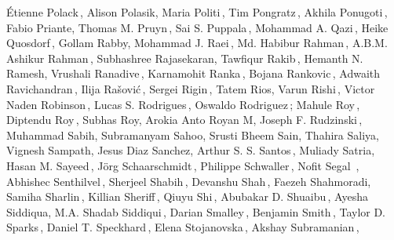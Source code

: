 \begin{center}
Étienne Polack\,,\;
Alison Polasik,\;
Maria Politi\,,\;
Tim Pongratz\,,\;
Akhila Ponugoti\,,\;
Fabio Priante,\;
Thomas M. Pruyn\,,\;
Sai S. Puppala\,,\;
Mohammad A. Qazi\,,\;
Heike Quosdorf\,,\;
Gollam Rabby,\;
Mohammad J. Raei\,,\;
Md. Habibur Rahman\,,\;
A.B.M. Ashikur Rahman\,,\;
Subhashree Rajasekaran,\;
Tawfiqur Rakib\,,\;
Hemanth N. Ramesh,\;
Vrushali Ranadive\,,\;
Karnamohit Ranka\,,\;
Bojana Rankovic\,,\;
Adwaith Ravichandran\,,\;
Ilija Rašović\,,\;
Sergei Rigin\,,\;
Tatem Rios,\;
Varun Rishi\,,\;
Victor Naden Robinson\,,\;
Lucas S. Rodrigues\,,\;
Oswaldo Rodriguez\,;
Mahule Roy\,,\;
Diptendu Roy\,,\;
Subhas Roy,\;
Arokia Anto Royan M,\;
Joseph F. Rudzinski\,,\;
Muhammad Sabih,\;
Subramanyam Sahoo,\;
Srusti Bheem Sain,\;
Thahira Saliya,\;
Vignesh Sampath,\;
Jesus Diaz Sanchez,\;
Arthur S. S. Santos\,,\;
Muliady Satria,\;
Hasan M. Sayeed\,,\;
Jörg Schaarschmidt\,,\;
Philippe Schwaller\,,\;
Nofit Segal\, ,\;
Abhishec Senthilvel\,,\;
Sherjeel Shabih\,,\;
Devanshu Shah\,,\;
Faezeh Shahmoradi,\;
Samiha Sharlin\,,\;
Killian Sheriff\,,\;
Qiuyu Shi\,,\;
Abubakar D. Shuaibu\,,\;
Ayesha Siddiqua,\;
M.A. Shadab Siddiqui\,,\;
Darian Smalley\,,\;
Benjamin Smith\,,\;
Taylor D. Sparks\,,\;
Daniel T. Speckhard\,,\;
Elena Stojanovska\,,\;
Akshay Subramanian\,,\;

\end{center}
